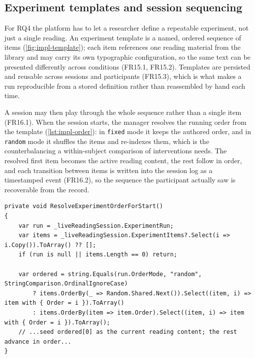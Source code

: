 \FloatBarrier
\subsection{Experiment templates and session sequencing}
\label{sec:impl-templates}

For RQ4 the platform has to let a researcher define a repeatable experiment, not just a single reading.
An experiment template is a named, ordered sequence of items (\cref{fig:impl-template}); each item references one reading material from the library and may carry its own typographic configuration, so the same text can be presented differently across conditions (FR15.1, FR15.2).
Templates are persisted and reusable across sessions and participants (FR15.3), which is what makes a run reproducible from a stored definition rather than reassembled by hand each time.

A session may then play through the whole sequence rather than a single item (FR16.1).
When the session starts, the manager resolves the running order from the template (\cref{lst:impl-order}): in \texttt{fixed} mode it keeps the authored order, and in \texttt{random} mode it shuffles the items and re-indexes them, which is the counterbalancing a within-subject comparison of interventions needs.
The resolved first item becomes the active reading content, the rest follow in order, and each transition between items is written into the session log as a timestamped event (FR16.2), so the sequence the participant actually saw is recoverable from the record.

\begin{listing}[htbp]
\begin{verbatim}
private void ResolveExperimentOrderForStart()
{
    var run = _liveReadingSession.ExperimentRun;
    var items = _liveReadingSession.ExperimentItems?.Select(i => i.Copy()).ToArray() ?? [];
    if (run is null || items.Length == 0) return;

    var ordered = string.Equals(run.OrderMode, "random", StringComparison.OrdinalIgnoreCase)
        ? items.OrderBy(_ => Random.Shared.Next()).Select((item, i) => item with { Order = i }).ToArray()
        : items.OrderBy(item => item.Order).Select((item, i) => item with { Order = i }).ToArray();
    // ...seed ordered[0] as the current reading content; the rest advance in order...
}
\end{verbatim}
\caption{Running-order resolution at session start (abbreviated from \texttt{ExperimentSessionManager.Lifecycle.cs}): fixed order or random shuffle with re-indexing; either way a simple ordered walk.}
\label{lst:impl-order}
\end{listing}

